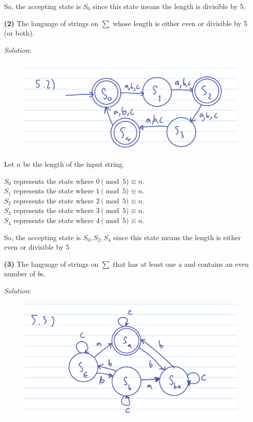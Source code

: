 \documentclass[a4paper, 11pt]{article}
\renewcommand{\part}[1] {\vspace{.10in} {\bf (#1)}}
\begin{document}
	So, the accepting state is $S_0$ since this state means the length is divisible by 5.
		
	\part{2} The language of strings on $\sum$ whose length is either even or divisible by 5 (or both).
	
	{\em Solution}:
	
	\begin{figure}[htbp]
		\centering
		\includegraphics[width=\linewidth]{figures/2.jpg}
	\end{figure}
	Let $n$ be the length of the input string.
	
	$S_0$ represents the state where $0 \pmod{5} \equiv n$.\\
	$S_1$ represents the state where $1 \pmod{5} \equiv n$.\\
	$S_2$ represents the state where $2 \pmod{5} \equiv n$.\\
	$S_3$ represents the state where $3 \pmod{5} \equiv n$.\\
	$S_4$ represents the state where $4 \pmod{5} \equiv n$.
	
	So, the accepting state is $S_0, S_2, S_4$ since this state means the length is either even or divisible by 5
	
	\part{3} The language of strings on $\sum$ that has at least one a and contains an even number of $b$s.
	
	{\em Solution}:
	\begin{figure}[htbp]
		\centering
		\includegraphics[width=\linewidth]{figures/3.jpg}
	\end{figure}
\end{document}
